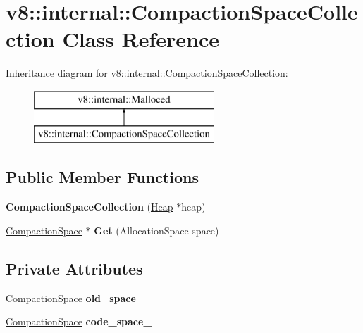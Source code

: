 \hypertarget{classv8_1_1internal_1_1_compaction_space_collection}{}\section{v8\+:\+:internal\+:\+:Compaction\+Space\+Collection Class Reference}
\label{classv8_1_1internal_1_1_compaction_space_collection}
Inheritance diagram for v8\+:\+:internal\+:\+:Compaction\+Space\+Collection\+:\begin{figure}[H]
\begin{center}
\leavevmode
\includegraphics[height=2.000000cm]{classv8_1_1internal_1_1_compaction_space_collection}
\end{center}
\end{figure}
\subsection*{Public Member Functions}
\begin{DoxyCompactItemize}
\item 
{\bfseries Compaction\+Space\+Collection} (\hyperlink{classv8_1_1internal_1_1_heap}{Heap} $\ast$heap)\hypertarget{classv8_1_1internal_1_1_compaction_space_collection_a0795ec298478e81866cbf0d683de58f6}{}\label{classv8_1_1internal_1_1_compaction_space_collection_a0795ec298478e81866cbf0d683de58f6}

\item 
\hyperlink{classv8_1_1internal_1_1_compaction_space}{Compaction\+Space} $\ast$ {\bfseries Get} (Allocation\+Space space)\hypertarget{classv8_1_1internal_1_1_compaction_space_collection_aaf5fd50dbd0262a2686f1d3a0805dea5}{}\label{classv8_1_1internal_1_1_compaction_space_collection_aaf5fd50dbd0262a2686f1d3a0805dea5}

\end{DoxyCompactItemize}
\subsection*{Private Attributes}
\begin{DoxyCompactItemize}
\item 
\hyperlink{classv8_1_1internal_1_1_compaction_space}{Compaction\+Space} {\bfseries old\+\_\+space\+\_\+}\hypertarget{classv8_1_1internal_1_1_compaction_space_collection_a160b173572f25e40c6f48e3befa855e2}{}\label{classv8_1_1internal_1_1_compaction_space_collection_a160b173572f25e40c6f48e3befa855e2}

\item 
\hyperlink{classv8_1_1internal_1_1_compaction_space}{Compaction\+Space} {\bfseries code\+\_\+space\+\_\+}\hypertarget{classv8_1_1internal_1_1_compaction_space_collection_aeb9aac1d64818a245e64392fa8971a6d}{}\label{classv8_1_1internal_1_1_compaction_space_collection_aeb9aac1d64818a245e64392fa8971a6d}

\end{DoxyCompactItemize}
